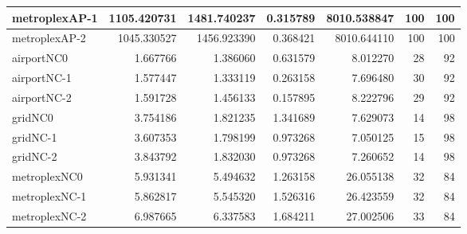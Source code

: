 \documentclass[../../../thesis.tex]{subfiles}
\begin{document}
\begin{longtable}{|l|r|r|r|r|r|r|}
metroplexAP-1 & 1105.420731 & 1481.740237 & 0.315789 & 8010.538847 & 100 & 100 \\ \hline
metroplexAP-2 & 1045.330527 & 1456.923390 & 0.368421 & 8010.644110 & 100 & 100 \\ \hline
airportNC0 & 1.667766 & 1.386060 & 0.631579 & 8.012270 & 28 & 92 \\ \hline
airportNC-1 & 1.577447 & 1.333119 & 0.263158 & 7.696480 & 30 & 92 \\ \hline
airportNC-2 & 1.591728 & 1.456133 & 0.157895 & 8.222796 & 29 & 92 \\ \hline
gridNC0 & 3.754186 & 1.821235 & 1.341689 & 7.629073 & 14 & 98 \\ \hline
gridNC-1 & 3.607353 & 1.798199 & 0.973268 & 7.050125 & 15 & 98 \\ \hline
gridNC-2 & 3.843792 & 1.832030 & 0.973268 & 7.260652 & 14 & 98 \\ \hline
metroplexNC0 & 5.931341 & 5.494632 & 1.263158 & 26.055138 & 32 & 84 \\ \hline
metroplexNC-1 & 5.862817 & 5.545320 & 1.526316 & 26.423559 & 32 & 84 \\ \hline
metroplexNC-2 & 6.987665 & 6.337583 & 1.684211 & 27.002506 & 33 & 84 \\ \hline
\end{longtable}
\end{document}
